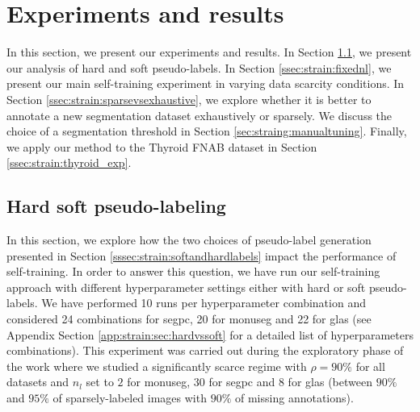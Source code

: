 
\section{Experiments and results}
\label{sec:strain:results}

In this section, we present our experiments and results. In Section \ref{ssec:strain:res:hardvssoft}, we present our analysis of hard and soft pseudo-labels. In Section \ref{ssec:strain:fixednl}, we present our main self-training experiment in varying data scarcity conditions. In Section \ref{ssec:strain:sparsevsexhaustive}, we explore whether it is better to annotate a new segmentation dataset exhaustively or sparsely. We discuss the choice of a segmentation threshold in Section \ref{sec:straing:manualtuning}. Finally, we apply our method to the Thyroid FNAB dataset in Section \ref{ssec:strain:thyroid_exp}.

\subsection{Hard \vs soft pseudo-labeling}
\label{ssec:strain:res:hardvssoft}


In this section, we explore how the two choices of pseudo-label generation presented in Section \ref{sssec:strain:softandhardlabels} impact the performance of self-training. In order to answer this question, we have run our self-training approach with different hyperparameter settings either with hard or soft pseudo-labels. We have performed 10 runs per hyperparameter combination and considered 24 combinations for \acrshort{segpc}, 20 for \acrshort{monuseg} and 22 for \acrshort{glas} (see Appendix Section \ref{app:strain:sec:hardvssoft} for a detailed list of hyperparameters combinations). This experiment was carried out during the exploratory phase of the work where we studied a significantly scarce regime with $\rho = 90\%$ for all datasets and $n_l$ set to $2$ for \acrshort{monuseg}, $30$ for \acrshort{segpc} and $8$ for \acrshort{glas} (\ie between $90\%$ and $95\%$ of sparsely-labeled images with $90\%$ of missing annotations).

